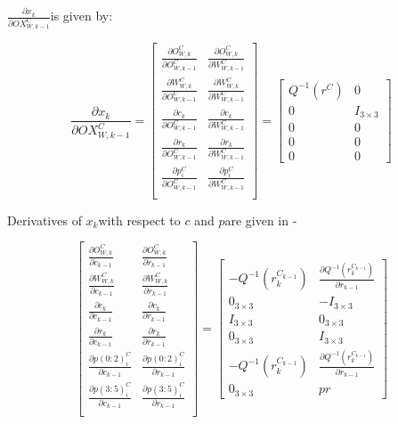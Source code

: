 $\frac{\partial x_{k}}{\partial OX_{W, k-1}^{C}}$is given by:

\begin{equation}
\frac{\partial x_{k}}{\partial OX_{W, k-1}^{C}}=\begin{bmatrix}
\frac{\partial O_{W,k}^{C}}{\partial O_{W,k-1}^{C}} & 
\frac{\partial O_{W,k}^{C}}{\partial W_{W,k-1}^{C}} \\
\frac{\partial W_{W,k}^{C}}{\partial O_{W,k-1}^{C}} & 
\frac{\partial W_{W,k}^{C}}{\partial W_{W,k-1}^{C}} \\
\frac{\partial c_{k}}{\partial O_{W,k-1}^{C}} &
\frac{\partial c_{k}}{\partial W_{W,k-1}^{C}} \\
\frac{\partial r_{k}}{\partial O_{W,k-1}^{C}} &
\frac{\partial r_{k}}{\partial W_{W,k-1}^{C}} \\
\frac{\partial p_{i}^{C}}{\partial O_{W,k-1}^{C}} & 
\frac{\partial p_{i}^{C}}{\partial W_{W,k-1}^{C}} \\
\end{bmatrix}= \begin{bmatrix}
Q^{-1}(r^{C}) & 0 \\
0 & I_{3\times 3} \\
0 & 0 \\
0 & 0 \\
0 & 0 
\end{bmatrix}
\end{equation}


Derivatives of $x_{k}$with respect to $c$ and $p$are given in - 


\begin{equation}
\begin{bmatrix}
\frac{\partial O_{W,k}^{C}}{\partial c_{k-1}} & 
\frac{\partial O_{W,k}^{C}}{\partial r_{k-1}} \\
\frac{\partial W_{W,k}^{C}}{\partial c_{k-1}} &
\frac{\partial W_{W,k}^{C}}{\partial r_{k-1}} \\
\frac{\partial c_{k}}{\partial c_{k-1}} & 
\frac{\partial c_{k}}{\partial r_{k-1}} \\
\frac{\partial r_{k}}{\partial c_{k-1}} & 
\frac{\partial r_{k}}{\partial r_{k-1}} \\
\frac{\partial p(0:2)_{i}^{C}}{\partial c_{k-1}} & 
\frac{\partial p(0:2)_{i}^{C}}{\partial r_{k-1}} \\
\frac{\partial p(3:5)_{i}^{C}}{\partial c_{k-1}} & 
\frac{\partial p(3:5)_{i}^{C}}{\partial r_{k-1}} \\
\end{bmatrix}= \begin{bmatrix}
-Q^{-1}(r_{k}^{C_{k-1}}) & 
\frac{\partial Q^{-1}(r_{k}^{C_{k-1}})}{\partial r_{k-1}} \\
0_{3\times 3} & -I_{3\times 3} \\
I_{3\times 3} & 0_{3\times 3} \\
0_{3\times 3} & I_{3\times 3} \\
-Q^{-1}(r_{k}^{C_{k-1}}) & 
\frac{\partial Q^{-1}(r_{k}^{C_{k-1}})}{\partial r_{k-1}} \\
0_{3\times 3} & pr 
\end{bmatrix}
\end{equation}

